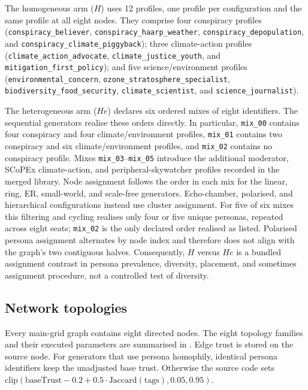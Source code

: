 The homogeneous arm (\(H\)) uses 12 profiles, one profile per configuration
and the same profile at all eight nodes.  They comprise four conspiracy
profiles (\texttt{conspiracy\_believer},
\texttt{conspiracy\_haarp\_weather},
\texttt{conspiracy\_depopulation}, and
\texttt{conspiracy\_climate\_piggyback}); three climate-action profiles
(\texttt{climate\_action\_advocate}, \texttt{climate\_justice\_youth}, and
\texttt{mitigation\_first\_policy}); and five science/environment profiles
(\texttt{environmental\_concern},
\texttt{ozone\_stratosphere\_specialist},
\texttt{biodiversity\_food\_security}, \texttt{climate\_scientist}, and
\texttt{science\_journalist}).

The heterogeneous arm (\(He\)) declares six ordered mixes of eight
identifiers. The sequential generators realise these orders directly.
In particular, \texttt{mix\_00} contains four conspiracy and four
climate/environment profiles, \texttt{mix\_01} contains two conspiracy and six
climate/environment profiles, and \texttt{mix\_02} contains no conspiracy
profile.  Mixes \texttt{mix\_03}--\texttt{mix\_05} introduce the additional
moderator, SCoPEx climate-action, and peripheral-skywatcher profiles recorded
in the merged library. Node assignment follows the order in each mix for the
linear, ring, ER, small-world, and scale-free generators. Echo-chamber,
polarised, and hierarchical configurations instead use cluster assignment.
For five of six mixes this filtering and cycling realises only four or five
unique personas, repeated across eight seats; \texttt{mix\_02} is the only
declared order realised as listed. Polarised persona assignment alternates by
node index and therefore does not align with the graph's two contiguous
halves. Consequently, \(H\) versus \(He\) is a bundled assignment contrast in
persona prevalence, diversity, placement, and sometimes assignment procedure,
not a controlled test of diversity.

\subsection{Network topologies}
\label{subsec:simulation-topologies}

Every main-grid graph contains eight directed nodes.  The eight topology
families and their executed parameters are summarised in
.  Edge trust is stored on the source node.
For generators that use persona homophily, identical persona identifiers keep
the unadjusted base trust. Otherwise the source code sets
\(\mathrm{clip}(\mathrm{baseTrust}-0.2+0.5\cdot\mathrm{Jaccard}(\mathrm{tags}),0.05,0.95)\).

